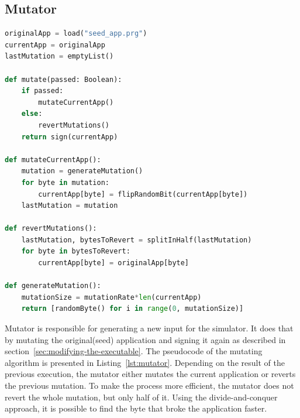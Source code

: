\subsection*{Mutator}
\begin{lstlisting}[caption={Pseudocode of the mutating algorithm},captionpos=b,label={lst:mutator},language=Python]
originalApp = load("seed_app.prg")
currentApp = originalApp
lastMutation = emptyList()

def mutate(passed: Boolean):
    if passed:
        mutateCurrentApp()
    else:
        revertMutations()
    return sign(currentApp)

def mutateCurrentApp():
    mutation = generateMutation()
    for byte in mutation:
        currentApp[byte] = flipRandomBit(currentApp[byte])
    lastMutation = mutation

def revertMutations():
    lastMutation, bytesToRevert = splitInHalf(lastMutation)
    for byte in bytesToRevert:
        currentApp[byte] = originalApp[byte]

def generateMutation():
    mutationSize = mutationRate*len(currentApp)
    return [randomByte() for i in range(0, mutationSize)]
\end{lstlisting}

Mutator is responsible for generating a new input for the simulator.
It does that by mutating the original(seed) application and signing it again as described in section~\ref{sec:modifying-the-executable}.
The pseudocode of the mutating algorithm is presented in Listing~\ref{lst:mutator}.
Depending on the result of the previous execution, the mutator either mutates the current application or reverts the previous mutation.
To make the process more efficient, the mutator does not revert the whole mutation, but only half of it.
Using the divide-and-conquer approach, it is possible to find the byte that broke the application faster.



